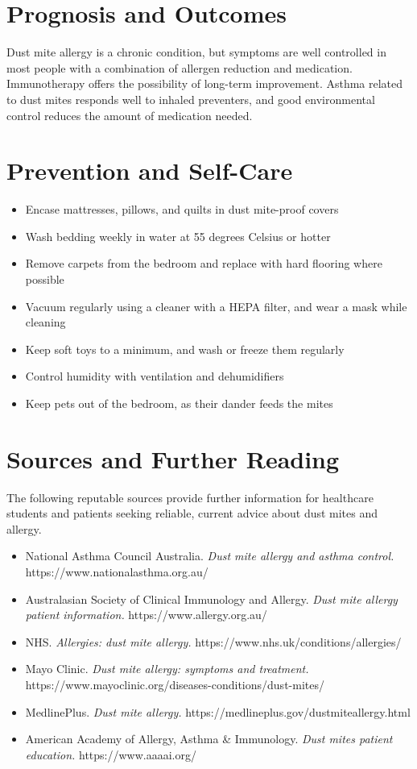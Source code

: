 \section*{Prognosis and Outcomes}
Dust mite allergy is a chronic condition, but symptoms are well controlled in most people with a combination of allergen reduction and medication. Immunotherapy offers the possibility of long-term improvement. Asthma related to dust mites responds well to inhaled preventers, and good environmental control reduces the amount of medication needed.

\section*{Prevention and Self-Care}
\begin{itemize}
    \item Encase mattresses, pillows, and quilts in dust mite-proof covers
    \item Wash bedding weekly in water at 55 degrees Celsius or hotter
    \item Remove carpets from the bedroom and replace with hard flooring where possible
    \item Vacuum regularly using a cleaner with a HEPA filter, and wear a mask while cleaning
    \item Keep soft toys to a minimum, and wash or freeze them regularly
    \item Control humidity with ventilation and dehumidifiers
    \item Keep pets out of the bedroom, as their dander feeds the mites
\end{itemize}

\section*{Sources and Further Reading}
The following reputable sources provide further information for healthcare students and patients seeking reliable, current advice about dust mites and allergy.
\begin{itemize}
    \item National Asthma Council Australia. \textit{Dust mite allergy and asthma control.} https://www.nationalasthma.org.au/
    \item Australasian Society of Clinical Immunology and Allergy. \textit{Dust mite allergy patient information.} https://www.allergy.org.au/
    \item NHS. \textit{Allergies: dust mite allergy.} https://www.nhs.uk/conditions/allergies/
    \item Mayo Clinic. \textit{Dust mite allergy: symptoms and treatment.} https://www.mayoclinic.org/diseases-conditions/dust-mites/
    \item MedlinePlus. \textit{Dust mite allergy.} https://medlineplus.gov/dustmiteallergy.html
    \item American Academy of Allergy, Asthma \& Immunology. \textit{Dust mites patient education.} https://www.aaaai.org/
\end{itemize}
